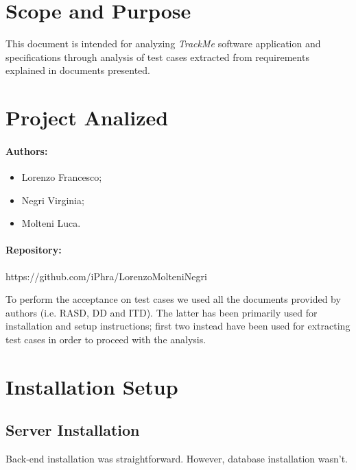 \documentclass[a4paper]{article}
\begin{document}

\tableofcontents
{}

\newpage
\pagestyle{fancy}
\section{Scope and Purpose}
This document is intended for analyzing \textit{TrackMe} software application and specifications through analysis of test cases extracted from requirements explained in documents presented.

\section{Project Analized}
\paragraph{Authors:}
\begin{itemize}
    \item Lorenzo Francesco;
    \item Negri Virginia;
    \item Molteni Luca.
\end{itemize}
\paragraph{Repository:}
https://github.com/iPhra/LorenzoMolteniNegri \newline

To perform the acceptance on test cases we used all the documents provided by authors (i.e. RASD, DD and ITD). The latter has been primarily used for installation and setup instructions; first two instead have been used for extracting test cases in order to proceed with the analysis.

\section{Installation Setup}
\subsection{Server Installation}
Back-end installation was straightforward. However, database installation wasn't.
\end{document}
